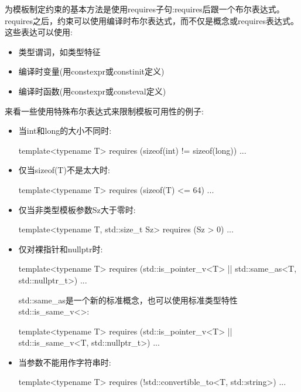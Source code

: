 为模板制定约束的基本方法是使用requires子句:requires后跟一个布尔表达式。requires之后，约束可以使用编译时布尔表达式，而不仅是概念或requires表达式。这些表达可以使用:

\begin{itemize}
\item
类型谓词，如类型特征

\item
编译时变量(用constexpr或constinit定义)

\item
编译时函数(用constexpr或consteval定义)
\end{itemize}

来看一些使用特殊布尔表达式来限制模板可用性的例子:

\begin{itemize}
\item
当int和long的大小不同时:

\begin{cpp}
template<typename T>
requires (sizeof(int) != sizeof(long))
...
\end{cpp}

\item
仅当sizeof(T)不是太大时:

\begin{cpp}
template<typename T>
requires (sizeof(T) <= 64)
...
\end{cpp}

\item
仅当非类型模板参数Sz大于零时:

\begin{cpp}
template<typename T, std::size_t Sz>
requires (Sz > 0)
...
\end{cpp}

\item
仅对裸指针和nullptr时:

\begin{cpp}
template<typename T>
requires (std::is_pointer_v<T> || std::same_as<T, std::nullptr_t>)
...
\end{cpp}

std::same\_as是一个新的标准概念，也可以使用标准类型特性std::is\_same\_v<>:

\begin{cpp}
template<typename T>
requires (std::is_pointer_v<T> || std::is_same_v<T, std::nullptr_t>)
...
\end{cpp}

\item
当参数不能用作字符串时:

\begin{cpp}
template<typename T>
requires (!std::convertible_to<T, std::string>)
...
\end{cpp}


\end{itemize}
